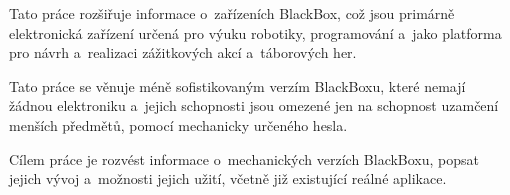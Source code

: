 Tato práce rozšiřuje informace o~zařízeních BlackBox, což jsou primárně elektronická zařízení určená pro 
výuku robotiky, programování a~jako platforma pro návrh a~realizaci zážitkových akcí a~táborových her.

Tato práce se věnuje méně sofistikovaným verzím BlackBoxu, které nemají žádnou elektroniku 
a~jejich schopnosti jsou omezené jen na schopnost uzamčení menších předmětů, pomocí mechanicky určeného hesla.

Cílem práce je rozvést informace o~mechanických verzích BlackBoxu, popsat jejich vývoj a~možnosti jejich užití, 
včetně již existující reálné aplikace.